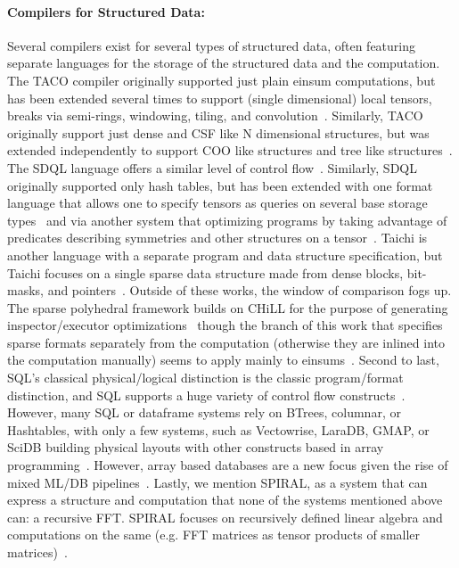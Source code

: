 \paragraph{ Compilers for Structured Data:}
Several compilers exist for several types of structured data, often featuring separate languages for the storage of the structured data and the computation.
%
The TACO compiler originally supported just plain einsum computations, but has been extended several times to support (single dimensional) local tensors, breaks via semi-rings, windowing, tiling, and convolution~\cite{kjolstad_tensor_2017, kjolstad_tensor_2019, senanayake2020sparse, henry_compilation_2021,won2023unified}.
%
Similarly, TACO originally support just dense and CSF like N dimensional structures, but was extended independently to support COO like structures and tree like structures~\cite{kjolstad_tensor_2017, chou2018format, chou2022compilation}.
%
The SDQL language offers a similar level of control flow~\cite{shaikhha2022functional}.
%
Similarly, SDQL originally supported only hash tables, but has been extended with one format language that allows one to specify tensors as queries on several base storage types~\cite{schleich2023optimizing} and via another system that optimizing programs by taking advantage of predicates describing symmetries and other structures on a tensor~\cite{ghorbani2023compiling}.
%
Taichi is another language with a separate program and data structure specification, but Taichi focuses on a single sparse data structure made from dense blocks, bit-masks, and pointers~\cite{hu_taichi_2019}.
%
Outside of these works, the window of comparison fogs up.
%
The sparse polyhedral framework builds on CHiLL for the purpose of generating inspector/executor optimizations~\cite{strout2018sparse} though the branch of this work that specifies sparse formats separately from the computation (otherwise they are inlined into the computation manually) seems to apply mainly to einsums~\cite{zhao2022polyhedral}.
%
Second to last, SQL's classical physical/logical distinction is the classic program/format distinction, and SQL supports a huge variety of control flow constructs~\cite{kotlyar1997relational, date1989guide}.
%
However, many SQL or dataframe systems rely on BTrees, columnar, or Hashtables, with only a few systems, such as Vectowrise, LaraDB, GMAP, or SciDB building physical layouts with other constructs based in array programming~\cite{boncz2012vectorwise,hutchison2017laradb,  tsatalos1996gmap, stonebraker2013scidb}.
%
However, array based databases are a new focus given the rise of mixed ML/DB pipelines~\cite{baumann2021array,luo2018scalable}.
%
Lastly, we mention SPIRAL, as a system that can express a structure and computation that none of the systems mentioned above can: a recursive FFT. 
%
SPIRAL focuses on recursively defined linear algebra and computations on the same (e.g. FFT matrices as tensor products of smaller matrices)~\cite{franchetti2018spiral,franchetti2009operator}.
%

